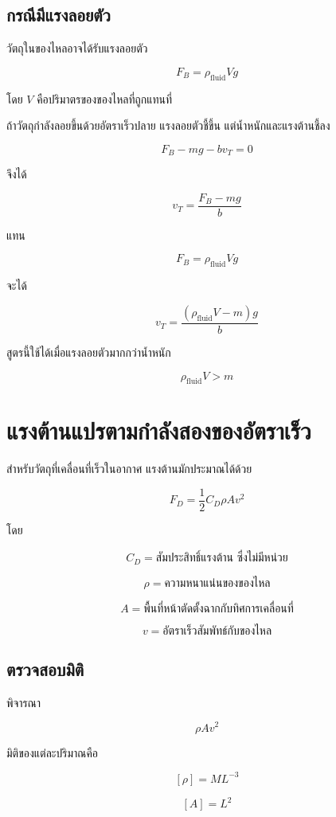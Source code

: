 \subsection{กรณีมีแรงลอยตัว}

วัตถุในของไหลอาจได้รับแรงลอยตัว

\[
F_B=\rho_{\text{fluid}}Vg
\]

โดย $V$ คือปริมาตรของของไหลที่ถูกแทนที่

ถ้าวัตถุกำลังลอยขึ้นด้วยอัตราเร็วปลาย
แรงลอยตัวชี้ขึ้น แต่น้ำหนักและแรงต้านชี้ลง

\[
F_B-mg-bv_T=0
\]

จึงได้

\[
\boxed{
v_T=\frac{F_B-mg}{b}
}
\]

แทน

\[
F_B=\rho_{\text{fluid}}Vg
\]

จะได้

\[
\boxed{
v_T
=
\frac{(\rho_{\text{fluid}}V-m)g}{b}
}
\]

สูตรนี้ใช้ได้เมื่อแรงลอยตัวมากกว่าน้ำหนัก

\[
\rho_{\text{fluid}}V>m
\]

\section{แรงต้านแปรตามกำลังสองของอัตราเร็ว}

สำหรับวัตถุที่เคลื่อนที่เร็วในอากาศ
แรงต้านมักประมาณได้ด้วย

\[
\boxed{
F_D
=
\frac{1}{2}C_D\rho A v^2
}
\]

โดย

\[
C_D=\text{สัมประสิทธิ์แรงต้าน ซึ่งไม่มีหน่วย}
\]

\[
\rho=\text{ความหนาแน่นของของไหล}
\]

\[
A=\text{พื้นที่หน้าตัดตั้งฉากกับทิศการเคลื่อนที่}
\]

\[
v=\text{อัตราเร็วสัมพัทธ์กับของไหล}
\]

\subsection{ตรวจสอบมิติ}

พิจารณา

\[
\rho A v^2
\]

มิติของแต่ละปริมาณคือ

\[
[\rho]=ML^{-3}
\]

\[
[A]=L^2
\]

